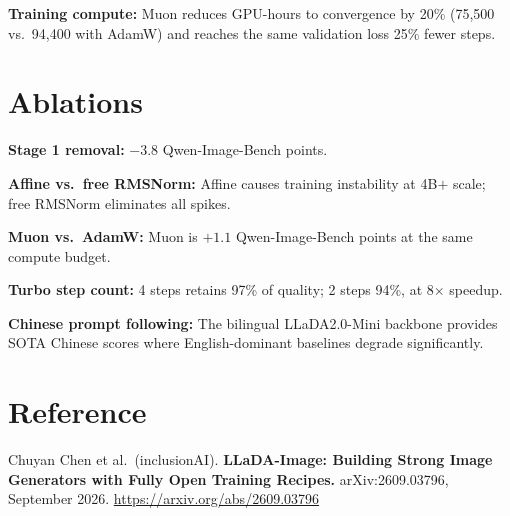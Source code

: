 \documentclass[10pt,twocolumn]{article}
\begin{document}
\textbf{Training compute:} Muon reduces GPU-hours to convergence by
20\% (75,500 vs.\ 94,400 with AdamW) and reaches the same validation
loss 25\% fewer steps.

\section{Ablations}

\textbf{Stage 1 removal:} $-3.8$ Qwen-Image-Bench points.

\textbf{Affine vs.\ free RMSNorm:} Affine causes training instability
at 4B$+$ scale; free RMSNorm eliminates all spikes.

\textbf{Muon vs.\ AdamW:} Muon is $+1.1$ Qwen-Image-Bench points
at the same compute budget.

\textbf{Turbo step count:} 4 steps retains 97\% of quality; 2 steps
94\%, at 8$\times$ speedup.

\textbf{Chinese prompt following:} The bilingual LLaDA2.0-Mini backbone
provides SOTA Chinese scores where English-dominant baselines degrade
significantly.

\section*{Reference}

Chuyan Chen et al.\ (inclusionAI).
\textbf{LLaDA-Image: Building Strong Image Generators with Fully Open
Training Recipes.}
arXiv:2609.03796, September 2026.
\url{https://arxiv.org/abs/2609.03796}
\end{document}
